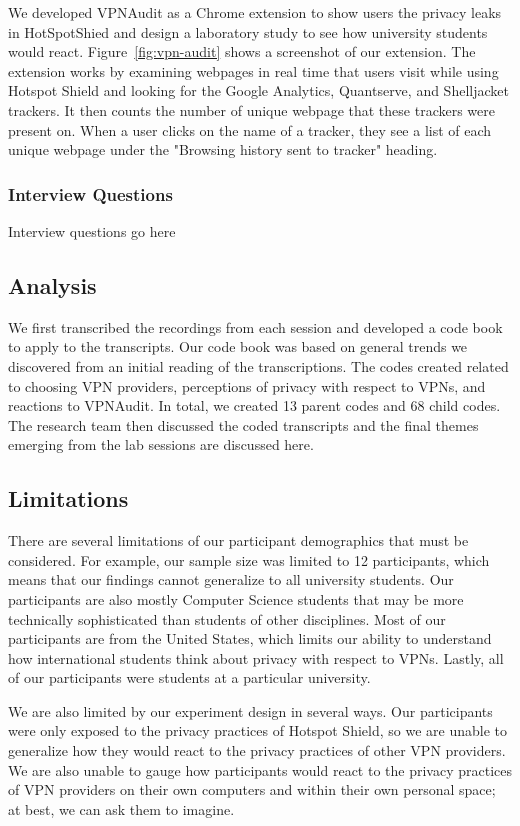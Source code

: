 We developed VPNAudit as a Chrome extension to show users the privacy leaks in HotSpotShied and design a laboratory study to see how university students would react.
Figure~\ref{fig:vpn-audit} shows a screenshot of our extension.
The extension works by examining webpages in real time that users visit while using Hotspot Shield and looking for the Google Analytics, Quantserve, and Shelljacket trackers.
It then counts the number of unique webpage that these trackers were present on.
When a user clicks on the name of a tracker, they see a list of each unique webpage under the "Browsing history sent to tracker" heading. 

\subsubsection{Interview Questions}
Interview questions go here 

\subsection{Analysis}
We first transcribed the recordings from each session and developed a code book to apply to the transcripts.
Our code book was based on general trends we discovered from an initial reading of the transcriptions.
The codes created related to choosing VPN providers, perceptions of privacy with respect to VPNs, and reactions to VPNAudit.
In total, we created 13 parent codes and 68 child codes.  The research team then discussed the coded transcripts and the final themes emerging from the lab sessions are discussed here.

\subsection{Limitations}
There are several limitations of our participant demographics that must be considered.
For example, our sample size was limited to 12 participants, which means that our findings cannot generalize to all university students.
Our participants are also mostly Computer Science students that may be more technically sophisticated than students of other disciplines.
Most of our participants are from the United States, which limits our ability to understand how international students think about privacy with respect to VPNs.
Lastly, all of our participants were students at a particular university.

We are also limited by our experiment design in several ways.
Our participants were only exposed to the privacy practices of Hotspot Shield, so we are unable to generalize how they would react to the privacy practices of other VPN providers.
We are also unable to gauge how participants would react to the privacy practices of VPN providers on their own computers and within their own personal space; at best, we can ask them to imagine.